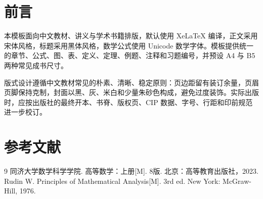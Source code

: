 \documentclass[b5]{cntextbook}
\begin{document}
\frontmatter
\MakeTextbookCover
\MakeHalfTitle

\chapter*{前言}
本模板面向中文教材、讲义与学术书籍排版，默认使用 XeLaTeX 编译，正文采用宋体风格，标题采用黑体风格，数学公式使用 Unicode 数学字体。模板提供统一的章节、公式、图、表、定义、定理、例题、注释和习题编号，并预设 A4 与 B5 两种常见成书尺寸。

版式设计遵循中文教材常见的朴素、清晰、稳定原则：页边距留有装订余量，页眉页脚保持克制，封面以黑、灰、米白和少量朱砂色构成，避免过度装饰。实际出版时，应按出版社的最终开本、书脊、版权页、CIP 数据、字号、行距和印前规范进一步校订。

\tableofcontents

\mainmatter



\backmatter
\chapter*{参考文献}
\begin{thebibliography}{9}
同济大学数学科学学院. 高等数学：上册[M]. 8版. 北京：高等教育出版社，2023.
Rudin W. Principles of Mathematical Analysis[M]. 3rd ed. New York: McGraw-Hill, 1976.
\end{thebibliography}
\end{document}
